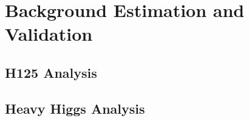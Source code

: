 
%
%

\chapter{Background Estimation and Validation}
\label{bg_val}


\section{H125 Analysis}
\label{h125_bg_val}



\section{Heavy Higgs Analysis}
\label{hh_bg_val}



%
% 
% 
